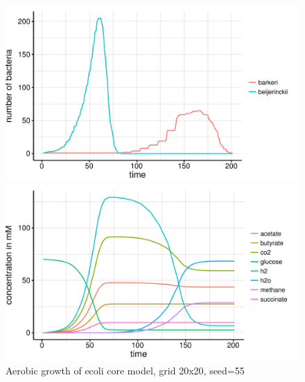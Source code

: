 \begin{figure}[h]
  \centering
  \begin{minipage}[t]{0.45\textwidth}
    \includegraphics[width=\textwidth]{../results/barkeri_beijerinckii_20x20_seed6764_growth.pdf}
  \end{minipage}
  \begin{minipage}[t]{0.45\textwidth}
    \includegraphics[width=\textwidth]{../results/barkeri_beijerinckii_20x20_seed6764_subs.pdf}
  \end{minipage}
  \caption{Aerobic growth of ecoli core model, grid 20x20, seed=55}
\end{figure}

